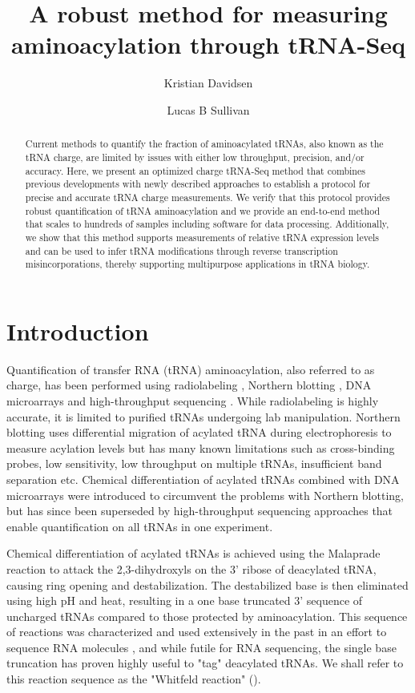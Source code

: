 \documentclass[9pt,lineno]{elife}
\title{A robust method for measuring aminoacylation through tRNA-Seq}
\author[1,2]{Kristian Davidsen}
\author[1*]{Lucas B Sullivan}
\affil[1]{Fred Hutchinson Cancer Center}
\affil[2]{Molecular and cellular biology program, University of Washington}
\begin{document}
\maketitle

\begin{abstract}
Current methods to quantify the fraction of aminoacylated tRNAs, also known as the tRNA charge, are limited by issues with either low throughput, precision, and/or accuracy.
Here, we present an optimized charge tRNA-Seq method that combines previous developments with newly described approaches to establish a protocol for precise and accurate tRNA charge measurements.
We verify that this protocol provides robust quantification of tRNA aminoacylation and we provide an end-to-end method that scales to hundreds of samples including software for data processing.
Additionally, we show that this method supports measurements of relative tRNA expression levels and can be used to infer tRNA modifications through reverse transcription misincorporations, thereby supporting multipurpose applications in tRNA biology.
\end{abstract}






\section{Introduction}
Quantification of transfer RNA (tRNA) aminoacylation, also referred to as charge, has been performed using radiolabeling \citep{Wolfson2002-gp}, Northern blotting \citep{Ho1987-ug, Varshney1991-zp, Stenum2017-wn}, DNA microarrays \citep{Dittmar2005-va} and high-throughput sequencing \citep{Evans2017-st}.
While radiolabeling is highly accurate, it is limited to purified tRNAs undergoing lab manipulation.
Northern blotting uses differential migration of acylated tRNA during electrophoresis to measure acylation levels but has many known limitations such as cross-binding probes, low sensitivity, low throughput on multiple tRNAs, insufficient band separation etc.
Chemical differentiation of acylated tRNAs combined with DNA microarrays were introduced to circumvent the problems with Northern blotting, but has since been superseded by high-throughput sequencing approaches that enable quantification on all tRNAs in one experiment.

Chemical differentiation of acylated tRNAs is achieved using the Malaprade reaction to attack the 2,3-dihydroxyls on the 3’ ribose of deacylated tRNA, causing ring opening and destabilization.
The destabilized base is then eliminated using high pH and heat, resulting in a one base truncated 3' sequence of uncharged tRNAs compared to those protected by aminoacylation.
This sequence of reactions was characterized and used extensively in the past in an effort to sequence RNA molecules \citep{Whitfeld1953-ca, Whitfeld1954-wl, Khym1961-xf, Neu1964-hu}, and while futile for RNA sequencing, the single base truncation has proven highly useful  to "tag" deacylated tRNAs.
We shall refer to this reaction sequence as the "Whitfeld reaction" ().
\end{document}
